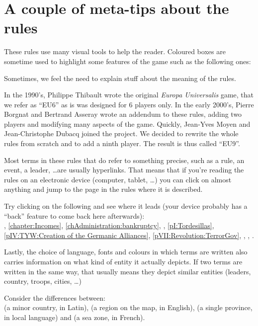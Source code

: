 \section*{A couple of meta-tips about the rules}
These rules use many visual tools to help the reader. Coloured boxes are
sometime used to highlight some features of the game such as the following
ones:
\begin{designnote}
  Sometimes, we feel the need to explain stuff about the meaning of the rules.
\end{designnote}
\begin{histoire}
  In the 1990's, Philippe Thibault wrote the original \emph{Europa
    Universalis} game, that we refer as ``EU6'' as is was designed for 6
  players only. In the early 2000's, Pierre Borgnat and Bertrand Asseray wrote
  an addendum to these rules, adding two players and modifying many aspects of
  the game. Quickly, Jean-Yves Moyen and Jean-Christophe Dubacq joined the
  project. We decided to rewrite the whole rules from scratch and to add a
  ninth player. The result is thus called ``EU9''.
\end{histoire}

Most terms in these rules that do refer to something precise, such as a rule,
an event, a leader, \ldots are usually hyperlinks. That means that if you're
reading the rules on an electronic device (computer, tablet, \ldots) you can
click on almost anything and jump to the page in the rules where it is
described.

\begin{exemple}[Hyperlinks]
  Try clicking on the following and see where it leads (your device probably
  has a ``back'' feature to come back here afterwards):\\
  \ANG, \ref{chapter:Incomes}, \ref{chAdministration:bankruptcy},
  \continentBrazil, \ref{pI:Tordesillas}, \ref{pIV:TYW:Creation of the
    Germanic Alliances}, \ref{pVII:Revolution:TerrorGov}, \monarqueSuleyman,
  \ministreRichelieu, .
\end{exemple}

Lastly, the choice of language, fonts and colours in which terms are written
also carries information on what kind of entity it actually depicts. If two
terms are written in the same way, that usually means they depict similar
entities (leaders, country, troops, cities, \ldots)

\begin{exemple}
  Consider the differences between:\\
  \paysVnorvege (a minor country, in Latin), \regionNorvege (a region on the
  map, in English), \provinceNorvege (a single province, in local language)
  and \seazoneNorvege (a sea zone, in French).
\end{exemple}

